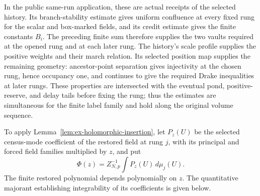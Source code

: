 In the public same-run application, these are actual receipts of the selected
history. Its branch-stability estimate gives uniform confluence at every
fixed rung for the scalar and box-marked fields, and its credit estimate gives
the finite constants $B_i$. The preceding finite sum therefore supplies the
two vaults required at the opened rung and at each later rung. The history's
scale profile supplies the positive weights and their march relation. Its
selected position map supplies the remaining geometry: ancestor-point
separation gives injectivity at the chosen rung, hence occupancy one, and
continues to give the required Drake inequalities at later rungs. These
properties are intersected with the eventual pond, positive-reserve, and
delay tails before fixing the rung; thus the estimates are simultaneous for
the finite label family and hold along the original volume sequence.

To apply Lemma~\ref{lem:ex-holomorphic-insertion}, let $P_z(U)$ be the
selected census-mode coefficient of the restored field at rung $j$, with its
principal and forced field families multiplied by $z$, and put
\[
 \Phi(z)=Z_{N,p}^{-1}\int P_z(U)\,d\mu_j(U).
\]
The finite restored polynomial depends polynomially on $z$. The quantitative
majorant establishing integrability of its coefficients is given below.

